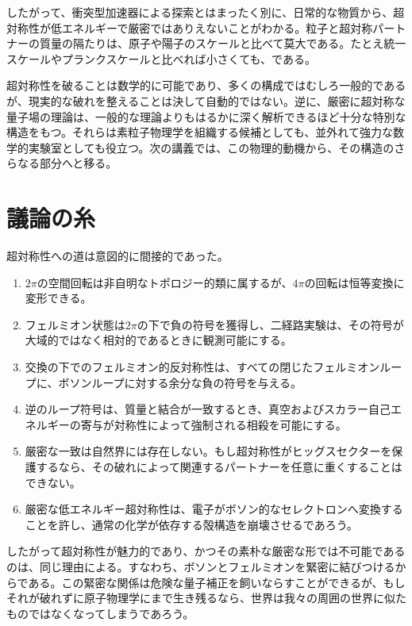 \begin{classroomqa}
\end{classroomqa}

したがって、衝突型加速器による探索とはまったく別に、日常的な物質から、超対称性が低エネルギーで厳密ではありえないことがわかる。粒子と超対称パートナーの質量の隔たりは、原子や陽子のスケールと比べて莫大である。たとえ統一スケールやプランクスケールと比べれば小さくても、である。

\begin{classroomqa}
\end{classroomqa}

超対称性を破ることは数学的に可能であり、多くの構成ではむしろ一般的であるが、現実的な破れを整えることは決して自動的ではない。逆に、厳密に超対称な量子場の理論は、一般的な理論よりもはるかに深く解析できるほど十分な特別な構造をもつ。それらは素粒子物理学を組織する候補としても、並外れて強力な数学的実験室としても役立つ。次の講義では、この物理的動機から、その構造のさらなる部分へと移る。

\section{議論の糸}

超対称性への道は意図的に間接的であった。
\begin{enumerate}
\item \(2\pi\)の空間回転は非自明なトポロジー的類に属するが、\(4\pi\)の回転は恒等変換に変形できる。
\item フェルミオン状態は\(2\pi\)の下で負の符号を獲得し、二経路実験は、その符号が大域的ではなく相対的であるときに観測可能にする。
\item 交換の下でのフェルミオン的反対称性は、すべての閉じたフェルミオンループに、ボソンループに対する余分な負の符号を与える。
\item 逆のループ符号は、質量と結合が一致するとき、真空およびスカラー自己エネルギーの寄与が対称性によって強制される相殺を可能にする。
\item 厳密な一致は自然界には存在しない。もし超対称性がヒッグスセクターを保護するなら、その破れによって関連するパートナーを任意に重くすることはできない。
\item 厳密な低エネルギー超対称性は、電子がボソン的なセレクトロンへ変換することを許し、通常の化学が依存する殻構造を崩壊させるであろう。
\end{enumerate}

したがって超対称性が魅力的であり、かつその素朴な厳密な形では不可能であるのは、同じ理由による。すなわち、ボソンとフェルミオンを緊密に結びつけるからである。この緊密な関係は危険な量子補正を飼いならすことができるが、もしそれが破れずに原子物理学にまで生き残るなら、世界は我々の周囲の世界に似たものではなくなってしまうであろう。